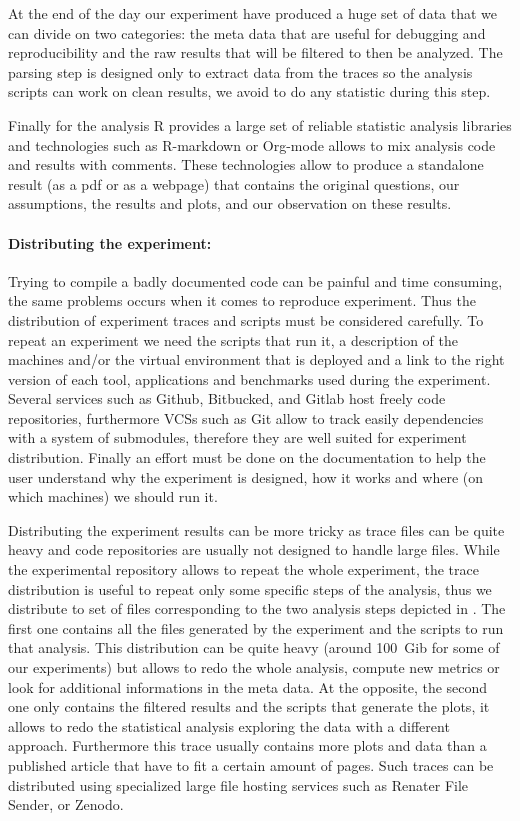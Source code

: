 At the end of the day our experiment have produced a huge set of data that we
can divide on two categories: the meta data that are useful for debugging and
reproducibility and the raw results that will be filtered to then be analyzed.
The parsing step is designed only to extract data from the traces so the
analysis scripts can work on clean results, we avoid to do any statistic
during this step.

Finally for the analysis \gls{R} provides a large set of reliable statistic
analysis libraries and technologies such as \gls{R-markdown} or
\gls{Org-mode} allows to mix analysis code and results with comments. These
technologies allow to produce a standalone result (as a pdf or as a webpage)
that contains the original questions, our assumptions, the results and plots,
and our observation on these results.

\paragraph{Distributing the experiment:}

Trying to compile a badly documented code can be painful and time consuming,
the same problems occurs when it comes to reproduce experiment. Thus the
distribution of experiment traces and scripts must be considered carefully.
To repeat an experiment we need the scripts that run it, a description of the
machines and/or the virtual environment that is deployed and a link to the
right version of each tool, applications and benchmarks used during the
experiment. Several services such as Github, Bitbucked, and Gitlab  host freely code repositories, furthermore \glspl{VCS} such as \gls{Git}
 allow to track easily dependencies with a system of
submodules, therefore they are well suited for experiment distribution.
Finally an effort must be done on the documentation to help the user
understand why the experiment is designed, how it works and where (on which
machines) we should run it.

Distributing the experiment results can be more tricky as trace files can be
quite heavy and code repositories are usually not designed to handle large
files. While the experimental repository allows to repeat the whole
experiment, the trace distribution is useful to repeat only some specific
steps of the analysis, thus we distribute to set of files corresponding to the
two analysis steps depicted in . The first one contains all
the files generated by the experiment and the scripts to run that analysis.
This distribution can be quite heavy (around \SI{100}{Gib} for some of our
experiments) but allows to redo the whole analysis, compute new metrics or
look for additional informations in the meta data. At the opposite, the second
one only contains the filtered results and the scripts that generate the
plots, it allows to redo the statistical analysis exploring the data with a
different approach. Furthermore this trace usually contains more plots and
data than a published article that have to fit a certain amount of pages. Such
traces can be distributed using specialized large file hosting services such
as Renater File Sender, or Zenodo.


